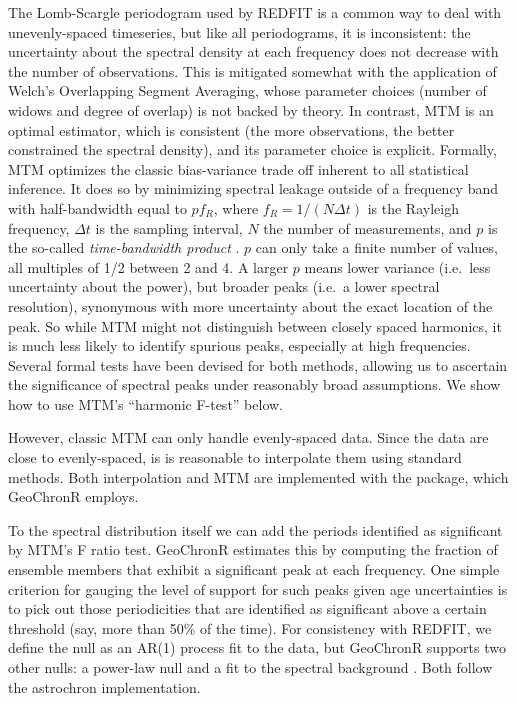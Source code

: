 \documentclass[gchron, manuscript]{copernicus}
\begin{document}
The Lomb-Scargle periodogram used by REDFIT is a common way to deal with unevenly-spaced timeseries, but like all periodograms, it is inconsistent: the uncertainty about the spectral density at each frequency does not decrease with the number of observations. This is mitigated somewhat with the application of Welch's Overlapping Segment Averaging, whose parameter choices (number of widows and degree of overlap) is not backed by theory.
In contrast, MTM \citep{thomson82} is an optimal estimator, which is consistent (the more observations, the better constrained the spectral density), and its parameter choice is explicit. Formally, MTM optimizes the classic bias-variance trade off inherent to all statistical inference.
It does so by minimizing spectral leakage outside of a frequency band with half-bandwidth equal to \(pf_R\), where \(f_R=1/(N \Delta t)\) is the Rayleigh frequency, \(\Delta t\) is the sampling interval, \(N\) the number of measurements, and \(p\) is the so-called \emph{time-bandwidth product} \citep{Ghil02}.
\(p\) can only take a finite number of values, all multiples of 1/2 between 2 and 4.
A larger \(p\) means lower variance (i.e.~less uncertainty about the power), but broader peaks (i.e.~a lower spectral resolution), synonymous with more uncertainty about the exact location of the peak.
So while MTM might not distinguish between closely spaced harmonics, it is much less likely to identify spurious peaks, especially at high frequencies.
Several formal tests have been devised for both methods, allowing us to ascertain the significance of spectral peaks under reasonably broad assumptions. We show how to use MTM's ``harmonic F-test'' below.

However, classic MTM can only handle evenly-spaced data. Since the data are close to evenly-spaced, is is reasonable to interpolate them using standard methods. Both interpolation and MTM are implemented with the \citep[astrochron][]{astrochron} package, which GeoChronR employs.

To the spectral distribution itself we can add the periods identified as significant by MTM's F ratio test. GeoChronR estimates this by computing the fraction of ensemble members that exhibit a significant peak at each frequency. One simple criterion for gauging the level of support for such peaks given age uncertainties is to pick out those periodicities that are identified as significant above a certain threshold (say, more than 50\% of the time). For consistency with REDFIT, we define the null as an AR(1) process fit to the data, but GeoChronR supports two other nulls: a power-law null and a fit to the spectral background \citep{MannLees96}.
Both follow the astrochron implementation.
\end{document}
